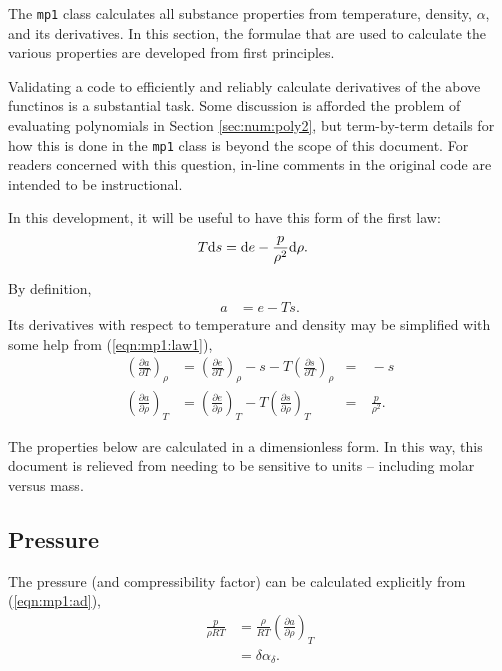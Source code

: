 The \texttt{mp1} class calculates all substance properties from temperature, density, $\alpha$, and its derivatives.  In this section, the formulae that are used to calculate the various properties are developed from first principles.

Validating a code to efficiently and reliably calculate derivatives of the above functinos is a substantial task.  Some discussion is afforded the problem of evaluating polynomials in Section \ref{sec:num:poly2}, but term-by-term details for how this is done in the \texttt{mp1} class is beyond the scope of this document.  For readers concerned with this question, in-line comments in the original code are intended to be instructional.

In this development, it will be useful to have this form of the first law:
\begin{align}
T\mathrm{d} s &= \mathrm{d} e - \frac{p}{\rho^2} \mathrm{d} \rho\label{eqn:mp1:law1}.
\end{align}

By definition,
\begin{align}
a &= e - Ts \label{eqn:mp1:a}.
\end{align}
Its derivatives with respect to temperature and density may be simplified with some help from (\ref{eqn:mp1:law1}),
\begin{align}
\left(\frac{\partial a}{\partial T}\right)_\rho &= \left(\frac{\partial e}{\partial T}\right)_\rho - s - T \left(\frac{\partial s}{\partial T}\right)_\rho &=& \ -s\label{eqn:mp1:at}\\
\left(\frac{\partial a}{\partial \rho}\right)_T &= \left(\frac{\partial e}{\partial \rho}\right)_T - T \left(\frac{\partial s}{\partial \rho}\right)_T &=& \ \frac{p}{\rho^2} \label{eqn:mp1:ad}.
\end{align}

The properties below are calculated in a dimensionless form.  In this way, this document is relieved from needing to be sensitive to units -- including molar versus mass. 
 
\subsection{Pressure}\label{sec:mp1:p}

The pressure (and compressibility factor) can be calculated explicitly from (\ref{eqn:mp1:ad}),
\begin{align}
\frac{p}{\rho R T} &=  \frac{\rho}{R T}\left(\frac{\partial a}{\partial \rho}\right)_T\nonumber\\
&= \delta \alpha_\delta\label{eqn:mp1:p}.
\end{align}

